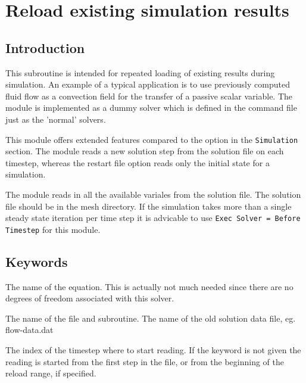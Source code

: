 \chapter{Reload existing simulation results}

\noindent
{}


\section{Introduction}

This subroutine is intended for repeated loading of existing results
during simulation. An example of a typical application is to use
previously computed fluid flow as a convection field for the transfer
of a passive scalar variable. The module is implemented as a dummy
solver which is defined in the command file just as the 'normal'
solvers.

This module offers extended features compared to the \texttt{} option in the \texttt{Simulation} section. The module reads a new
solution step from the solution file on each timestep, whereas the
restart file option reads only the initial state for a simulation.

The module reads in all the available variales from the solution
file. The solution file should be in the mesh directory. If the
simulation takes more than a single steady state iteration per time
step it is advicable to use \texttt{Exec Solver = Before Timestep} for
this module.


\section{Keywords}

\sifbegin
{}
\sifbegin
{}
The name of the equation. This is actually not much needed 
since there are no degrees of freedom associated with this solver.

The name of the file and subroutine. 
The name of the old solution data file, eg. flow-data.dat

The index of the timestep where to start reading. If the keyword is
not given the reading is started from the first step in the file, or
from the beginning of the reload range, if specified.

